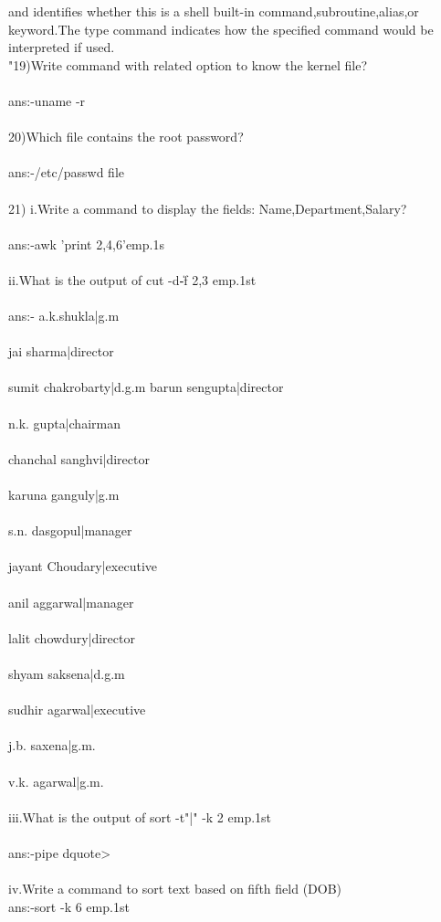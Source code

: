 \documentclass{article}
\begin{document}
{and identifies whether this is a shell built-in command,subroutine,alias,or keyword.The type
command indicates how the specified command would be interpreted if used.\\"19)Write command with related option to know the kernel file?\\ \\
ans:-uname -r\\ \\
20)Which file contains the root password?\\ \\
ans:-/etc/passwd file\\ \\
21)
i.Write a command to display the fields:
Name,Department,Salary?\\ \\
ans:-awk '{print 2,4,6}'emp.1s\\ \\
ii.What is the output of cut -d\| -f 2,3 emp.1st\\ \\
ans:- a.k.shukla|g.m\\ \\
jai sharma|director\\ \\
sumit chakrobarty|d.g.m
barun sengupta|director\\ \\
n.k. gupta|chairman\\ \\
chanchal sanghvi|director\\ \\
karuna ganguly|g.m\\ \\
s.n. dasgopul|manager\\ \\
jayant Choudary|executive\\ \\
anil aggarwal|manager\\ \\
lalit chowdury|director\\ \\
shyam saksena|d.g.m\\ \\
sudhir agarwal|executive\\ \\
j.b. saxena|g.m.\\ \\
v.k. agarwal|g.m.\\ \\
iii.What is the output of sort -t"|" -k 2 emp.1st\\ \\
ans:-pipe dquote>\\ \\
iv.Write a command to sort text based on fifth field (DOB)\\
ans:-sort -k 6 emp.1st\\
}
\end{document}
